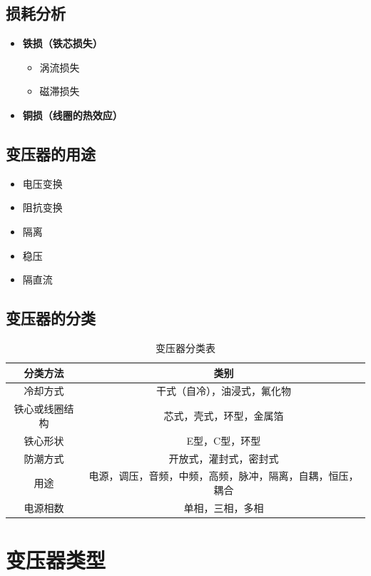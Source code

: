 \documentclass[12pt,UTF8]{ctexbook}
\begin{document}
\section{损耗分析}

\begin{itemize}
    \item \textbf{铁损（铁芯损失）}
    \begin{itemize}
        \item 涡流损失
        \item 磁滞损失
    \end{itemize}
    \item \textbf{铜损（线圈的热效应）}
\end{itemize}

\section{变压器的用途}

\begin{itemize}
    \item 电压变换
    \item 阻抗变换
    \item 隔离
    \item 稳压
    \item 隔直流
\end{itemize}

\section{变压器的分类}

\begin{table}[htbp]
\centering
\caption{变压器分类表}
\begin{tabular}{|c|c|}
\hline
\textbf{分类方法} & \textbf{类别} \\
\hline
冷却方式 & 干式（自冷），油浸式，氟化物 \\
\hline
铁心或线圈结构 & 芯式，壳式，环型，金属箔 \\
\hline
铁心形状 & E型，C型，环型 \\
\hline
防潮方式 & 开放式，灌封式，密封式 \\
\hline
用途 & 电源，调压，音频，中频，高频，脉冲，隔离，自耦，恒压，耦合 \\
\hline
电源相数 & 单相，三相，多相 \\
\hline
\end{tabular}
\end{table}

\chapter{变压器类型}
\label{chap:types}
\end{document}
